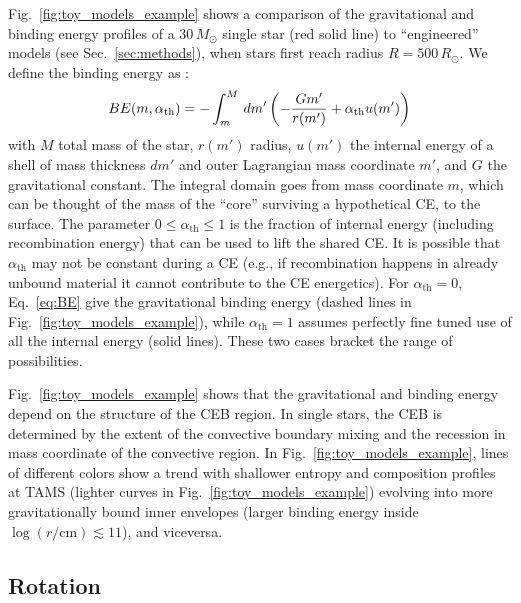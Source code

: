 \documentclass[twocolumn,twocolappendix,trackchanges]{aastex63}
\DeclareRobustCommand{\Eqref}[1]{Eq.~\ref{#1}}
\DeclareRobustCommand{\Figref}[1]{Fig.~\ref{#1}}
\DeclareRobustCommand{\Secref}[1]{Sec.~\ref{#1}}
\begin{document}
\Figref{fig:toy_models_example} shows a comparison of the
gravitational and binding energy profiles of a $30\,M_\odot$ single
star (red solid line) to
``engineered'' models (see \Secref{sec:methods}), when stars first
reach radius $R=500\,R_\odot$. We
define the binding energy as
\citep[e.g.,][]{dekool:1990, dewi:2000, lau:2022}:
\begin{equation}
  \label{eq:BE}
BE(m, \alpha_{\rm th}) = - \int_{m}^M\,dm'\left( -\frac{G m'}{r(m')}+\alpha_\mathrm{th} u(m')\right)
\end{equation}
with $M$ total mass of the star, $r(m')$ radius, $u(m')$ the internal
energy of a shell of mass thickness $dm'$ and outer Lagrangian mass
coordinate $m'$, and $G$ the gravitational constant. The integral
domain goes from mass coordinate $m$, which can be thought of the mass
of the ``core'' surviving a hypothetical CE, to the surface. The
parameter $0\leq \alpha_\mathrm{th}\leq 1$ is the fraction of internal
energy (including recombination energy) that can be used to lift the
shared CE. It is possible that $\alpha_\mathrm{th}$ may not be
constant during a CE (e.g., if recombination happens in already
unbound material it cannot contribute to the CE energetics). For
$\alpha_\mathrm{th}=0$, \Eqref{eq:BE} give the gravitational binding
energy (dashed lines in \Figref{fig:toy_models_example}), while
$\alpha_{\mathrm{th}}=1$ assumes perfectly fine tuned use of all the
internal energy (solid lines). These two cases bracket the range of
possibilities.

\Figref{fig:toy_models_example} shows that the gravitational and
binding energy depend on the structure of the CEB region. In single
stars, the CEB is determined by the extent of the convective boundary
mixing and the recession in mass coordinate of the
convective region. In \Figref{fig:toy_models_example}, lines of
different colors show a trend with shallower entropy and composition
profiles at TAMS (lighter curves in \Figref{fig:toy_models_example})
evolving into more gravitationally bound inner envelopes (larger
binding energy inside $\log(r/\mathrm{cm})\lesssim 11$), and viceversa.

\subsection{Rotation}
\label{sec:rot_examples}
\end{document}
